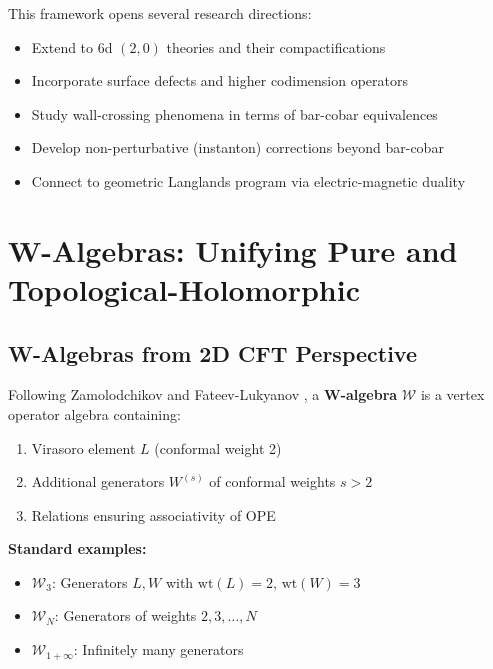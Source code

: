 \begin{remark}
This framework opens several research directions:
\begin{itemize}
\item Extend to 6d $(2,0)$ theories and their compactifications
\item Incorporate surface defects and higher codimension operators
\item Study wall-crossing phenomena in terms of bar-cobar equivalences
\item Develop non-perturbative (instanton) corrections beyond bar-cobar
\item Connect to geometric Langlands program via electric-magnetic duality
\end{itemize}
\end{remark}



\section{W-Algebras: Unifying Pure and Topological-Holomorphic}
\label{sec:w-algebras-unifying}

\subsection{W-Algebras from 2D CFT Perspective}

\begin{definition}\label{def:w-algebra-cft}
Following Zamolodchikov \cite{Zam85} and Fateev-Lukyanov \cite{FL88}, a 
\textbf{W-algebra} $\mathcal{W}$ is a vertex operator algebra containing:
\begin{enumerate}
\item Virasoro element $L$ (conformal weight 2)
\item Additional generators $W^{(s)}$ of conformal weights $s > 2$
\item Relations ensuring associativity of OPE
\end{enumerate}
\end{definition}

\textbf{Standard examples:}
\begin{itemize}
\item $\mathcal{W}_3$: Generators $L, W$ with $\text{wt}(L) = 2$, $\text{wt}(W) = 3$
\item $\mathcal{W}_N$: Generators of weights $2, 3, \ldots, N$
\item $\mathcal{W}_{1+\infty}$: Infinitely many generators
\end{itemize}

